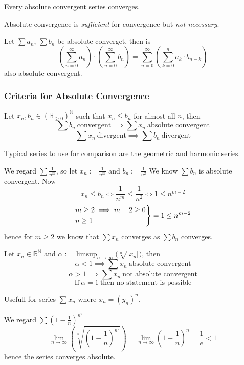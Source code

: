 \begin{theorem}
   Every absolute convergent series converges.
\end{theorem}
\begin{remark}
   Absolute convergence is \emph{sufficient} for convergence but \emph{not necessary}.
\end{remark}

\begin{theorem}
   Let \(\sum a_n\), \(\sum b_n\) be absolute converget, then is
   \[\left(\sum_{n=0}^\infty a_n\right) \cdot \left(\sum_{n=0}^\infty b_n\right) = \sum_{n=0}^\infty\left(\sum_{k=0}^n a_k \cdot b_{n - k}\right)\]
   also absolute convergent.
\end{theorem}

\subsubsection{Criteria for Absolute Convergence}
\begin{proposition}\label{pro:comparison_test}
   Let \(x_n, b_n \in (\mathbb{R}_{\geq 0})^\mathbb{N}\) such that \(x_n \leq b_n\) for almost all \(n\), then
   \[\sum b_n~\text{convergent} \implies \sum x_n~\text{absolute convergent}\]
   \[\sum x_n~\text{divergent} \implies \sum b_n~\text{divergent}\]
\end{proposition}
\begin{remark}
   Typical series to use for comparison are the geometric and harmonic series.
\end{remark}
\begin{example}
   We regard \(\sum \frac{1}{n^m}\), so let \(x_n := \frac{1}{n^m}\) and \(b_n := \frac{1}{n^2}\)
   We know \(\sum b_n\) is absolute convergent.
   Now
   \[x_n \leq b_n \iff \frac{1}{n^m} \leq \frac{1}{n^2} \iff 1 \leq n^{m-2}\]
   \[\begin{drcases}m \geq 2 \implies m-2 \geq 0\\n \geq 1\end{drcases} = 1 \leq n^{m-2}\]
   hence for \(m \geq 2\) we know that \(\sum x_n\) converges as \(\sum b_n\) converges.
\end{example}

\begin{proposition}\label{pro:root_test}
   Let \(x_n \in \mathbb{R}^\mathbb{N}\) and \(\alpha := \limsup_{n \to \infty}\big(\sqrt[n]{|x_n|}\big)\), then
   \[\alpha < 1 \implies \sum x_n~\text{absolute convergent}\]
   \[\alpha > 1 \implies \sum x_n~\text{not absolute convergent}\]
   \[\text{If}~\alpha = 1~\text{then no statement is possible}\]
\end{proposition}
\begin{remark}[Tips]
   Usefull for series \(\sum x_n\) where \(x_n = (y_n)^n\).
\end{remark}
\begin{example}
   We regard \(\sum \left(1 - \frac{1}{n}\right)^{n^2}\)
   \[\lim_{n \to \infty}\left(\sqrt[n]{\left(1 - \frac{1}{n}\right)^{n^2}}\right) = \lim_{n \to \infty} \left(1 - \frac{1}{n}\right)^n = \frac{1}{e} < 1\]
   hence the series converges absolute.
\end{example}

